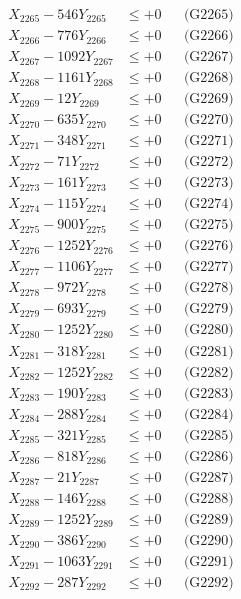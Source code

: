 \documentclass[a4paper,10pt]{article}
\begin{document}
{\begin{align}
X_{2265} - 546Y_{2265} &\leq +0 && \text{(G2265)} \\
X_{2266} - 776Y_{2266} &\leq +0 && \text{(G2266)} \\
X_{2267} - 1092Y_{2267} &\leq +0 && \text{(G2267)} \\
X_{2268} - 1161Y_{2268} &\leq +0 && \text{(G2268)} \\
X_{2269} - 12Y_{2269} &\leq +0 && \text{(G2269)} \\
X_{2270} - 635Y_{2270} &\leq +0 && \text{(G2270)} \\
\allowbreak
X_{2271} - 348Y_{2271} &\leq +0 && \text{(G2271)} \\
X_{2272} - 71Y_{2272} &\leq +0 && \text{(G2272)} \\
X_{2273} - 161Y_{2273} &\leq +0 && \text{(G2273)} \\
X_{2274} - 115Y_{2274} &\leq +0 && \text{(G2274)} \\
X_{2275} - 900Y_{2275} &\leq +0 && \text{(G2275)} \\
X_{2276} - 1252Y_{2276} &\leq +0 && \text{(G2276)} \\
X_{2277} - 1106Y_{2277} &\leq +0 && \text{(G2277)} \\
X_{2278} - 972Y_{2278} &\leq +0 && \text{(G2278)} \\
X_{2279} - 693Y_{2279} &\leq +0 && \text{(G2279)} \\
X_{2280} - 1252Y_{2280} &\leq +0 && \text{(G2280)} \\
\allowbreak
X_{2281} - 318Y_{2281} &\leq +0 && \text{(G2281)} \\
X_{2282} - 1252Y_{2282} &\leq +0 && \text{(G2282)} \\
X_{2283} - 190Y_{2283} &\leq +0 && \text{(G2283)} \\
X_{2284} - 288Y_{2284} &\leq +0 && \text{(G2284)} \\
X_{2285} - 321Y_{2285} &\leq +0 && \text{(G2285)} \\
X_{2286} - 818Y_{2286} &\leq +0 && \text{(G2286)} \\
X_{2287} - 21Y_{2287} &\leq +0 && \text{(G2287)} \\
X_{2288} - 146Y_{2288} &\leq +0 && \text{(G2288)} \\
X_{2289} - 1252Y_{2289} &\leq +0 && \text{(G2289)} \\
X_{2290} - 386Y_{2290} &\leq +0 && \text{(G2290)} \\
\allowbreak
X_{2291} - 1063Y_{2291} &\leq +0 && \text{(G2291)} \\
X_{2292} - 287Y_{2292} &\leq +0 && \text{(G2292)} \\

\end{align}}
\end{document}
